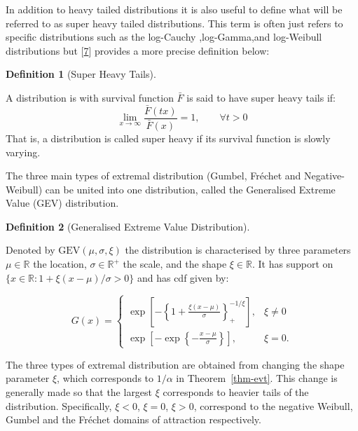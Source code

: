 \documentclass[
  10pt,
  a4paper,
]{scrreprt}
\theoremstyle{definition}
\newtheorem{definition}{Definition}[section]
\theoremstyle{plain}
\theoremstyle{plain}
\theoremstyle{remark}
\begin{document}
{In addition to heavy tailed distributions it is also useful to define
what will be referred to as super heavy tailed distributions. This term
is often just refers to specific distributions such as the log-Cauchy
,log-Gamma,and log-Weibull distributions but
{[}\protect\hyperlink{ref-fmh09}{7}{]} provides a more precise
definition below:

\begin{definition}[Super Heavy
Tails]\protect\hypertarget{def-sup}{}\label{def-sup}

A distribution is with survival function \(\bar F\) is said to have
super heavy tails if: \[
\lim_{x\rightarrow\infty}\displaystyle\frac{\bar F(tx)}{\bar F (x)} = 1,\qquad \forall t>0
\] That is, a distribution is called super heavy if its survival
function is slowly varying.

\end{definition}

The three main types of extremal distribution (Gumbel, Fréchet and
Negative-Weibull) can be united into one distribution, called the
Generalised Extreme Value (GEV) distribution.

\begin{definition}[Generalised Extreme Value
Distribution]\protect\hypertarget{def-gev}{}\label{def-gev}

Denoted by \(\text{GEV}(\mu,\sigma,\xi)\) the distribution is
characterised by three parameters \(\mu \in \mathbb R\) the location,
\(\sigma\in \mathbb R^+\) the scale, and the shape \(\xi\in \mathbb R\).
It has support on \(\{x\in \mathbb R:1+\xi(x-\mu)/\sigma > 0\}\) and has
cdf given by:

\[
G(x) = \begin{cases}\exp\left[-\left\{1+\displaystyle\frac{\xi(x-\mu)}{\sigma}\right\}_+^{-1/\xi}\right],&\xi\ne0\\
\exp\left[-\exp\left\{-\displaystyle\frac{x-\mu}{\sigma}\right\}\right],&\xi=0.
\end{cases}
\]

\end{definition}

The three types of extremal distribution are obtained from changing the
shape parameter \(\xi\), which corresponds to \(1/\alpha\) in
Theorem~\ref{thm-evt}. This change is generally made so that the largest
\(\xi\) corresponds to heavier tails of the distribution. Specifically,
\(\xi<0\), \(\xi=0\), \(\xi>0\), correspond to the negative Weibull,
Gumbel and the Fréchet domains of attraction respectively.

}
\end{document}
